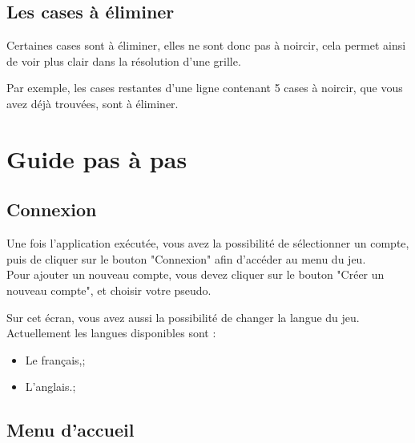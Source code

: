 \documentclass[a4paper, 12pt]{report}
\begin{document}
		\section{Les cases à éliminer}
            
            Certaines cases sont à éliminer, elles ne sont donc pas à noircir, cela permet ainsi de voir plus clair dans la résolution d'une grille.
            
            Par exemple, les cases restantes d'une ligne contenant 5 cases à noircir, que vous avez déjà trouvées, sont à éliminer.




\chapter{Guide pas à pas}
\thispagestyle{empty}
\thispagestyle{plain}

	\section{Connexion}

        Une fois l'application exécutée, vous avez la possibilité de sélectionner un compte, puis de cliquer sur le bouton "Connexion" afin d'accéder au menu du jeu. \\
        Pour ajouter un nouveau compte, vous devez cliquer sur le bouton "Créer un nouveau compte", et choisir votre pseudo.
        
        Sur cet écran, vous avez aussi la possibilité de changer la langue du jeu. Actuellement les langues disponibles sont :
        \begin{itemize}
            \item Le français,;
            \item L'anglais.;
        \end{itemize}
        

	\section{Menu d'accueil}
\end{document}
